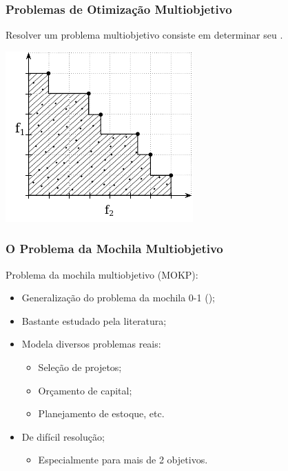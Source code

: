 \documentclass[10pt,xcolor=table,fleqn]{beamer}
\begin{document}
\begin{frame}
  \frametitle{Problemas de Otimização Multiobjetivo}
  \vfill
  Resolver um problema multiobjetivo consiste em determinar seu \paretoset{}.
  \vfill \pause
  \begin{center}
    \includegraphics[scale=0.8]{../img/mokp/pareto-def}
  \end{center}
  \vfill
\end{frame}

\begin{frame}
  \frametitle{O Problema da Mochila Multiobjetivo}
  Problema da mochila multiobjetivo (MOKP):
  \begin{itemize}
    \item Generalização do problema da mochila 0-1 (\nphard{});
    \item Bastante estudado pela literatura;
    \item Modela diversos problemas reais:
      \begin{itemize}
        \item Seleção de projetos;
        \item Orçamento de capital;
        \item Planejamento de estoque, etc.
      \end{itemize}
    \item De difícil resolução;
      \begin{itemize}
        \item Especialmente para mais de 2 objetivos.
      \end{itemize}
  \end{itemize}
\end{frame}
\end{document}
